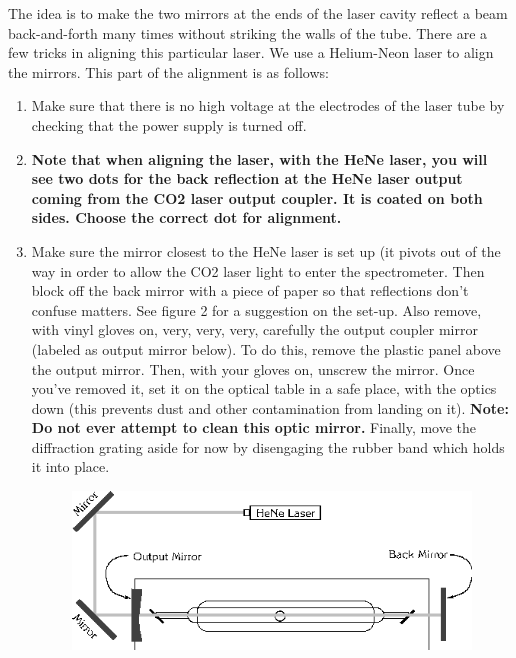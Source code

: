 \documentclass{../lab}
\begin{document}
The idea is to make the two mirrors at the ends of the laser cavity reflect a beam back-and-forth many times without striking the walls of the tube. There are a few tricks in aligning this particular laser. We use a Helium-Neon laser to align the mirrors. This part of the alignment is as follows:

\begin{enumerate}
    \item Make sure that there is no high voltage at the electrodes of the laser tube by checking that the power supply is turned off.
    \item \textbf{Note that when aligning the laser, with the HeNe laser, you will see two dots for the back reflection at the HeNe laser output coming from the CO2 laser output coupler.  It is coated on both sides. Choose the correct dot for alignment.}
    \item Make sure the mirror closest to the HeNe laser is set up (it pivots out of the way in order to allow the CO2 laser light to enter the spectrometer. Then block off the back mirror with a piece of paper so that reflections don't confuse matters. See figure 2 for a suggestion on the set-up. Also remove, with vinyl gloves on, very, very, very, carefully the output coupler mirror (labeled as output mirror below). To do this, remove the plastic panel above the output mirror. Then, with your gloves on, unscrew the mirror. Once you've removed it, set it on the optical table in a safe place, with the optics down (this prevents dust and other contamination from landing on it). \textbf{Note: Do not ever attempt to clean this optic mirror. }Finally, move the diffraction grating aside for now by disengaging the rubber band which holds it into place. 


 

\begin{figure}[h]
    \centering
    \href{http://experimentationlab.berkeley.edu/sites/default/files/images/CO24.gif}{\includegraphics[width=\linewidth]{images/CO24.png}}
    \caption{}
    \label{fig:CO24}
\end{figure}



\end{enumerate}
\end{document}
